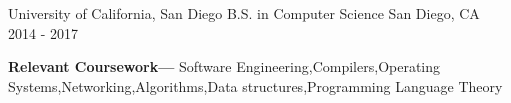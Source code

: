 

\begin{cventries}

  \cventry
    {University of California, San Diego} %
    {B.S. in Computer Science} %
    {San Diego, CA} %
    {2014 - 2017} %
    {
      \begin{cvitems} %
       \item 
       	 \textbf{Relevant Coursework---} Software Engineering,Compilers,Operating Systems,Networking,Algorithms,Data structures,Programming Language Theory
      \end{cvitems}
    }

\end{cventries}
